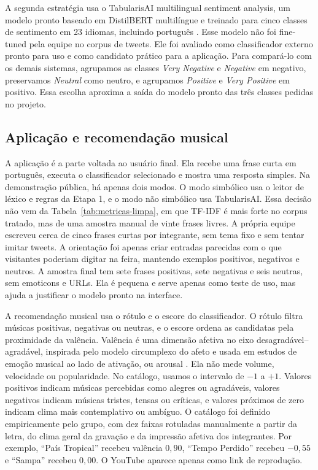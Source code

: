 \documentclass[11pt,a4paper]{article}
\begin{document}
A segunda estratégia usa o TabularisAI multilingual sentiment analysis, um modelo pronto baseado em DistilBERT multilíngue e treinado para cinco classes de sentimento em 23 idiomas, incluindo português \citep{sanh2019distilbert,tabularisai2025multilingualsentiment}. Esse modelo não foi fine-tuned pela equipe no corpus de tweets. Ele foi avaliado como classificador externo pronto para uso e como candidato prático para a aplicação. Para compará-lo com os demais sistemas, agrupamos as classes \emph{Very Negative} e \emph{Negative} em negativo, preservamos \emph{Neutral} como neutro, e agrupamos \emph{Positive} e \emph{Very Positive} em positivo. Essa escolha aproxima a saída do modelo pronto das três classes pedidas no projeto.

\subsection{Aplicação e recomendação musical}

A aplicação é a parte voltada ao usuário final. Ela recebe uma frase curta em português, executa o classificador selecionado e mostra uma resposta simples. Na demonstração pública, há apenas dois modos. O modo simbólico usa o leitor de léxico e regras da Etapa 1, e o modo não simbólico usa TabularisAI. Essa decisão não vem da Tabela~\ref{tab:metricas-limpa}, em que TF-IDF é mais forte no corpus tratado, mas de uma amostra manual de vinte frases livres. A própria equipe escreveu cerca de cinco frases curtas por integrante, sem tema fixo e sem tentar imitar tweets. A orientação foi apenas criar entradas parecidas com o que visitantes poderiam digitar na feira, mantendo exemplos positivos, negativos e neutros. A amostra final tem sete frases positivas, sete negativas e seis neutras, sem emoticons e URLs. Ela é pequena e serve apenas como teste de uso, mas ajuda a justificar o modelo pronto na interface.

A recomendação musical usa o rótulo e o escore do classificador. O rótulo filtra músicas positivas, negativas ou neutras, e o escore ordena as candidatas pela proximidade da valência. Valência é uma dimensão afetiva no eixo desagradável--agradável, inspirada pelo modelo circumplexo do afeto \citep{russell1980circumplex} e usada em estudos de emoção musical ao lado de ativação, ou arousal \citep{eerola2011music}. Ela não mede volume, velocidade ou popularidade. No catálogo, usamos o intervalo de $-1$ a $+1$. Valores positivos indicam músicas percebidas como alegres ou agradáveis, valores negativos indicam músicas tristes, tensas ou críticas, e valores próximos de zero indicam clima mais contemplativo ou ambíguo. O catálogo foi definido empiricamente pelo grupo, com dez faixas rotuladas manualmente a partir da letra, do clima geral da gravação e da impressão afetiva dos integrantes. Por exemplo, ``País Tropical'' recebeu valência $0{,}90$, ``Tempo Perdido'' recebeu $-0{,}55$ e ``Sampa'' recebeu $0{,}00$. O YouTube aparece apenas como link de reprodução.
\end{document}
